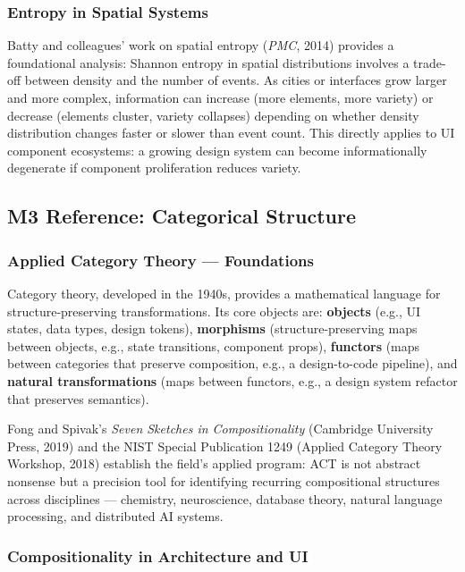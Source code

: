 \documentclass[11pt,letterpaper]{article}
\begin{document}
\subsubsection{Entropy in Spatial Systems}

Batty and colleagues' work on spatial entropy (\textit{PMC}, 2014) provides a foundational analysis: Shannon entropy in spatial distributions involves a trade-off between density and the number of events. As cities or interfaces grow larger and more complex, information can increase (more elements, more variety) or decrease (elements cluster, variety collapses) depending on whether density distribution changes faster or slower than event count. This directly applies to UI component ecosystems: a growing design system can become informationally degenerate if component proliferation reduces variety.

\subsection{M3 Reference: Categorical Structure}

\subsubsection{Applied Category Theory --- Foundations}

Category theory, developed in the 1940s, provides a mathematical language for structure-preserving transformations. Its core objects are: \textbf{objects} (e.g., UI states, data types, design tokens), \textbf{morphisms} (structure-preserving maps between objects, e.g., state transitions, component props), \textbf{functors} (maps between categories that preserve composition, e.g., a design-to-code pipeline), and \textbf{natural transformations} (maps between functors, e.g., a design system refactor that preserves semantics).

Fong and Spivak's \textit{Seven Sketches in Compositionality} (Cambridge University Press, 2019) and the NIST Special Publication 1249 (Applied Category Theory Workshop, 2018) establish the field's applied program: ACT is not abstract nonsense but a precision tool for identifying recurring compositional structures across disciplines --- chemistry, neuroscience, database theory, natural language processing, and distributed AI systems.

\subsubsection{Compositionality in Architecture and UI}
\end{document}
